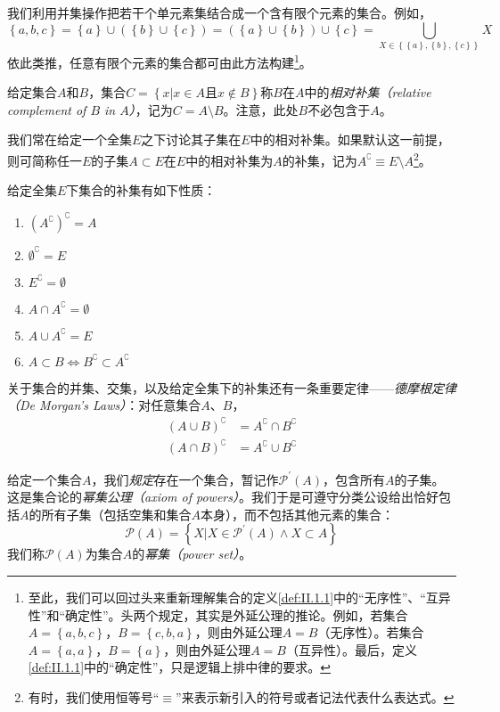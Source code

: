 \documentclass[../main.tex]{subfiles}
\begin{document}
我们利用并集操作把若干个单元素集结合成一个含有限个元素的集合。例如，
\[
    \left\{a,b,c\right\}=\left\{a\right\}\cup\left(\left\{b\right\}\cup\left\{c\right\}\right)=\left(\left\{a\right\}\cup\left\{b\right\}\right)\cup\left\{c\right\}=\bigcup_{X\in\left\{\left\{a\right\},\left\{b\right\},\left\{c\right\}\right\}}X
\]
依此类推，任意有限个元素的集合都可由此方法构建\footnote{至此，我们可以回过头来重新理解集合的定义\ref{def:II.1.1}中的“无序性”、“互异性”和“确定性”。头两个规定，其实是外延公理的推论。例如，若集合$A=\left\{a,b,c\right\}$，$B=\left\{c,b,a\right\}$，则由外延公理$A=B$（无序性）。若集合$A=\left\{a,a\right\}$，$B=\left\{a\right\}$，则由外延公理$A=B$（互异性）。最后，定义\ref{def:II.1.1}中的“确定性”，只是逻辑上排中律的要求。}。



给定集合$A$和$B$，集合$C=\left\{x|x\in A\text{且}x\notin B\right\}$称$B$在$A$中的\emph{相对补集（relative complement of $B$ in $A$）}，记为$C=A\setminus B$。注意，此处$B$不必包含于$A$。

我们常在给定一个全集$E$之下讨论其子集在$E$中的相对补集。如果默认这一前提，则可简称任一$E$的子集$A\subset E$在$E$中的相对补集为$A$的补集，记为$A^\complement\equiv E\setminus A$\footnote{有时，我们使用恒等号“$\equiv$”来表示新引入的符号或者记法代表什么表达式。}。

给定全集$E$下集合的补集有如下性质：
\begin{enumerate}
    \item $\left(A^\complement\right)^\complement=A$
    \item $\emptyset^\complement=E$
    \item $E^\complement=\emptyset$
    \item $A\cap A^\complement=\emptyset$
    \item $A\cup A^\complement=E$
    \item $A\subset B\Leftrightarrow B^\complement\subset A^\complement$
\end{enumerate}

关于集合的并集、交集，以及给定全集下的补集还有一条重要定律——\emph{德摩根定律（De Morgan's Laws）}：对任意集合$A$、$B$，
\begin{align*}
    \left(A\cup B\right)^\complement & =A^\complement\cap B^\complement \\
    \left(A\cap B\right)^\complement & =A^\complement\cup B^\complement
\end{align*}

给定一个集合$A$，我们\emph{规定}存在一个集合，暂记作$\mathcal{P}^\prime\left(A\right)$，包含所有$A$的子集。这是集合论的\emph{幂集公理（axiom of powers）}。我们于是可遵守分类公设给出恰好包括$A$的所有子集（包括空集和集合$A$本身），而不包括其他元素的集合：
\[
    \mathcal{P}\left(A\right)=\left\{X|X\in\mathcal{P}^\prime\left(A\right)\wedge X\subset A\right\}
\]
我们称$\mathcal{P}\left(A\right)$为集合$A$的\emph{幂集（power set）}。
\end{document}
